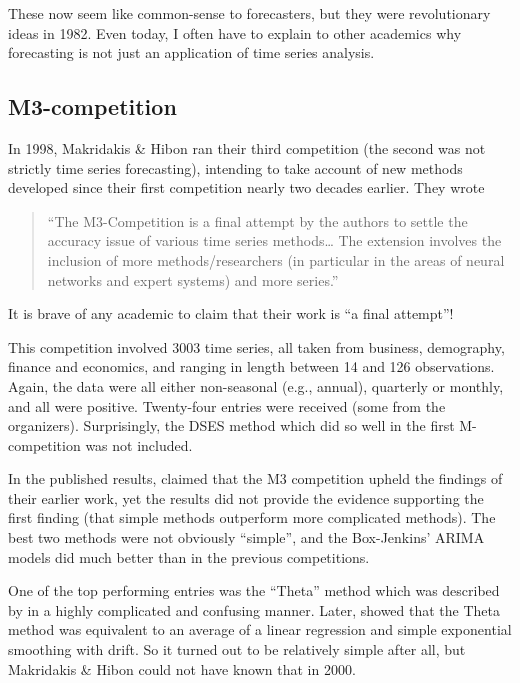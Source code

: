 \documentclass[11pt,a4paper,]{article}
\begin{document}
These now seem like common-sense to forecasters, but they were revolutionary ideas in 1982. Even today, I often have to explain to other academics why forecasting is not just an application of time series analysis.

\hypertarget{m3-competition}{%
\subsection*{M3-competition}\label{m3-competition}}

In 1998, Makridakis \& Hibon ran their third competition (the second was not strictly time series forecasting), intending to take account of new methods developed since their first competition nearly two decades earlier. They wrote

\begin{quote}
``The M3-Competition is a final attempt by the authors to settle the accuracy issue of various time series methods\ldots{} The extension involves the inclusion of more methods/researchers (in particular in the areas of neural networks and expert systems) and more series.''
\end{quote}

It is brave of any academic to claim that their work is ``a final attempt''!

This competition involved 3003 time series, all taken from business, demography, finance and economics, and ranging in length between 14 and 126 observations. Again, the data were all either non-seasonal (e.g., annual), quarterly or monthly, and all were positive. Twenty-four entries were received (some from the organizers). Surprisingly, the DSES method which did so well in the first M-competition was not included.

In the published results, \textcite{M3} claimed that the M3 competition upheld the findings of their earlier work, yet the results did not provide the evidence supporting the first finding (that simple methods outperform more complicated methods). The best two methods were not obviously ``simple'', and the Box-Jenkins' ARIMA models did much better than in the previous competitions.

One of the top performing entries was the ``Theta'' method which was described by \textcite{theta00} in a highly complicated and confusing manner. Later, \textcite{HB03} showed that the Theta method was equivalent to an average of a linear regression and simple exponential smoothing with drift. So it turned out to be relatively simple after all, but Makridakis \& Hibon could not have known that in 2000.
\end{document}

